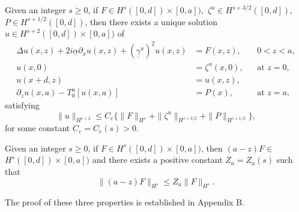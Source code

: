 \vskip 0.1in
\begin{theorem} Given an integer $s\ge 0$, if $F\in H^s([0,d])\times [0,a]),$ $\zeta^u \in H^{s+3/2}([0,d]),$ $P\in H^{s+1/2}([0,d])$, then there exists a unique solution $u\in H^{s+2}([0,d])\times [0,a])$ of 
\begin{subequations}
\begin{align}
\Delta u(x,z) +2i\underline{\alpha}\partial_{x}u(x,z)+(\underline{\gamma}^u)^2u(x,z)&=F(x,z), && \text{$0<z<a$},\\
u(x,0)&=\zeta^u(x,0), && \text{at $z=0$},\\
u(x+d,z)&=u(x,z),\\
\partial_z u(x,a)-T_0^u[u(x,a)] &= P(x), && \text{at $z=a$},
\end{align}
\end{subequations}
satisfying
\begin{equation}\|u\|_{H^{s+2}}\le C_e\{\|F\|_{H^{s}}+\|\zeta^u\|_{H^{s+3/2}}+\|P\|_{H^{s+1/2}}  \}, \end{equation}
for some constant $C_e = C_e(s) > 0$.
\end{theorem}
\vskip 0.1in
\begin{lemma}
Given an integer $s\ge 0$, if $F\in H^s([0,d])\times [0,a])$, then $(a-z)F \in$ $H^s([0,d])\times [0,a])$ and there exists a positive constant $Z_a = Z_a(s)$ such that
$$\|(a-z)F\|_{H^s} \le Z_a \|F\|_{H^s}.$$
\end{lemma}
\begin{flushleft}
The proof of these three properties is established in Appendix B.
\end{flushleft}